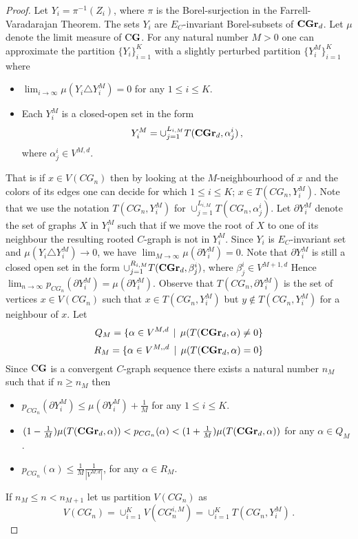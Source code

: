 \documentclass{article}
\newcommand{\CGrd}[1][d]{\textrm{\textbf{CGr}}_{#1}}
\newcommand{\CG}[1][G]{\textrm{C\textbf{#1}}}
\begin{document}
\begin{proof}
 Let $Y_i =
  \pi^{-1}(Z_i)$, where $\pi$ is the Borel-surjection
in the Farrell-Varadarajan Theorem.
The sets $Y_i$ are  $E_C$-invariant Borel-subsets of $\CGrd$.
Let $\mu$ denote the limit measure of $\CG$. For any 
natural number $M>0$ one
can approximate the partition $\{Y_i\}^K_{i=1}$ with
a slightly perturbed partition $\{Y^M_i\}^K_{i=1}$
where
\begin{itemize}
\item $\lim_{i\to\infty}
\mu(Y_i\triangle Y^M_i)=0$ for any $1\leq i \leq K$.
\item Each $Y^M_i$ is a closed-open set in the form
$$Y_i^M=\cup^{L_{i,M}}_{j=1} T(\CGrd,\alpha^i_j)\,,$$
where $\alpha^i_j\in V^{M,d}$.
\end{itemize}
That is if $x\in V(CG_n)$ then by looking at the $M$-neighbourhood of $x$
and the colors of its edges one can decide for which
$1\leq i \leq K$; $x\in T(CG_n,Y^M_i)$. Note that we use the notation
$T(CG_n,Y^M_i)$ for $\cup^{L_{i,M}}_{j=1} T(CG_n,\alpha^i_j)$.
Let $\partial Y^M_i$ denote the set of graphs $X$ in $Y^M_i$
such that if we move the root of $X$ to one of its neighbour the resulting
rooted $C$-graph is not in $Y^M_i$. Since $Y_i$ is $E_C$-invariant
set and $\mu(Y_i\triangle Y^M_i)\to 0$, we have $\lim_{M\to\infty}
\mu(\partial Y^M_i)=0$. Note that $\partial Y^M_i$ is
still a closed open set in the form 
$\cup^{R_{i,M}}_{j=1} T(\CGrd,\beta^i_j)$, where 
 $\beta^i_j\in V^{M+1,d}$
Hence $\lim_{n\to\infty} p_{CG_n}(\partial Y_i^M)=\mu(\partial Y_i^M)$.
Observe that $T(CG_n,\partial Y^M_i)$ is the set of vertices $x\in V(CG_n)$
such that $x\in T(CG_n,Y^M_i)$ but $y\notin T(CG_n,Y^M_i)$ for
a neighbour of $x$.
Let
$$Q_M=\{\alpha\in V^{M,d}\,\mid\, \mu(T(\CGrd,\alpha)\neq 0\}$$
$$R_M=\{\alpha\in V^{M,,d}\,\mid\, \mu(T(\CGrd,\alpha)=0\}$$
Since $\CG$ is a convergent $C$-graph sequence
there exists a natural number $n_M$ such that
if $n\geq n_M$ then
\begin{itemize}
\item $p_{CG_n}(\partial Y^M_i)\leq \mu(\partial Y^M_i)+\frac{1}{M}$
 for any $1\leq i \leq K$.
\item $(1-\frac{1}{M})\mu(T(\CGrd,\alpha))<p_{CG_n}(\alpha)<
(1+\frac{1}{M})\mu(T(\CGrd,\alpha))$ for any $\alpha\in Q_M$.
\item $p_{CG_n}(\alpha)\leq \frac{1}{M}\frac{1}{|V^{M,d}|}$, for any
$\alpha\in R_M$.
\end{itemize}
If $n_M\leq n <n_{M+1}$ let us partition $V(CG_n)$ as
$$V(CG_n)=\cup^K_{i=1} V(CG_n^{i,M})=\cup^K_{i=1} T(CG_n,Y^M_i)\,.$$

\end{proof}
\end{document}
